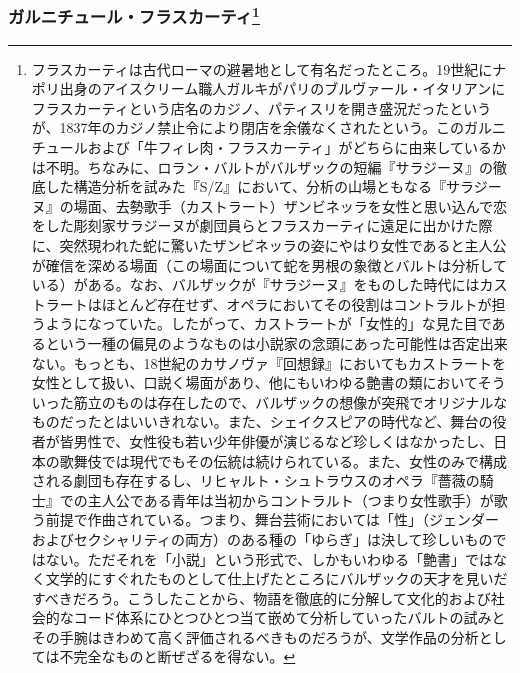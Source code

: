 \begin{recette}
{\subsubsection[ガルニチュール・フラスカーティ]{\texorpdfstring{ガルニチュール・フラスカーティ\footnote{フラスカーティは古代ローマの避暑地として有名だったところ。19世紀にナポリ出身のアイスクリーム職人ガルキがパリのブルヴァール・イタリアンにフラスカーティという店名のカジノ、パティスリを開き盛況だったというが、1837年のカジノ禁止令により閉店を余儀なくされたという。このガルニチュールおよび「牛フィレ肉・フラスカーティ」がどちらに由来しているかは不明。ちなみに、ロラン・バルトがバルザックの短編『サラジーヌ』の徹底した構造分析を試みた『S/Z』において、分析の山場ともなる『サラジーヌ』の場面、去勢歌手（カストラート）ザンビネッラを女性と思い込んで恋をした彫刻家サラジーヌが劇団員らとフラスカーティに遠足に出かけた際に、突然現われた蛇に驚いたザンビネッラの姿にやはり女性であると主人公が確信を深める場面（この場面について蛇を男根の象徴とバルトは分析している）がある。なお、バルザックが『サラジーヌ』をものした時代にはカストラートはほとんど存在せず、オペラにおいてその役割はコントラルトが担うようになっていた。したがって、カストラートが「女性的」な見た目であるという一種の偏見のようなものは小説家の念頭にあった可能性は否定出来ない。もっとも、18世紀のカサノヴァ『回想録』においてもカストラートを女性として扱い、口説く場面があり、他にもいわゆる艶書の類においてそういった筋立のものは存在したので、バルザックの想像が突飛でオリジナルなものだったとはいいきれない。また、シェイクスピアの時代など、舞台の役者が皆男性で、女性役も若い少年俳優が演じるなど珍しくはなかったし、日本の歌舞伎では現代でもその伝統は続けられている。また、女性のみで構成される劇団も存在するし、リヒャルト・シュトラウスのオペラ『薔薇の騎士』での主人公である青年は当初からコントラルト（つまり女性歌手）が歌う前提で作曲されている。つまり、舞台芸術においては「性」（ジェンダーおよびセクシャリティの両方）のある種の「ゆらぎ」は決して珍しいものではない。ただそれを「小説」という形式で、しかもいわゆる「艶書」ではなく文学的にすぐれたものとして仕上げたところにバルザックの天才を見いだすべきだろう。こうしたことから、物語を徹底的に分解して文化的および社会的なコード体系にひとつひとつ当て嵌めて分析していったバルトの試みとその手腕はきわめて高く評価されるべきものだろうが、文学作品の分析としては不完全なものと断ぜざるを得ない。}}{ガルニチュール・フラスカーティ}}\label{garniture-frascati}}




\end{recette}
